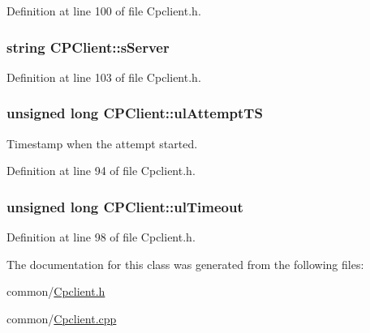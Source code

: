 \-Definition at line 100 of file \-Cpclient.\-h.

\hypertarget{class_c_p_client_a0b054ae566dabb8b7a794f8d53aec83a}{
\subsubsection[{s\-Server}]{\setlength{\rightskip}{0pt plus 5cm}string {\bf \-C\-P\-Client\-::s\-Server}}}\label{class_c_p_client_a0b054ae566dabb8b7a794f8d53aec83a}


\-Definition at line 103 of file \-Cpclient.\-h.

\hypertarget{class_c_p_client_a84c9b4e693df05ea1e4e0621d97ba6e7}{
\subsubsection[{ul\-Attempt\-T\-S}]{\setlength{\rightskip}{0pt plus 5cm}unsigned long {\bf \-C\-P\-Client\-::ul\-Attempt\-T\-S}}}\label{class_c_p_client_a84c9b4e693df05ea1e4e0621d97ba6e7}


\-Timestamp when the attempt started. 



\-Definition at line 94 of file \-Cpclient.\-h.

\hypertarget{class_c_p_client_a67a9b34f71126762d953ce9911ba8524}{
\subsubsection[{ul\-Timeout}]{\setlength{\rightskip}{0pt plus 5cm}unsigned long {\bf \-C\-P\-Client\-::ul\-Timeout}}}\label{class_c_p_client_a67a9b34f71126762d953ce9911ba8524}


\-Definition at line 98 of file \-Cpclient.\-h.



\-The documentation for this class was generated from the following files\-:\begin{DoxyCompactItemize}
\item 
common/\hyperlink{_cpclient_8h}{\-Cpclient.\-h}\item 
common/\hyperlink{_cpclient_8cpp}{\-Cpclient.\-cpp}\end{DoxyCompactItemize}
